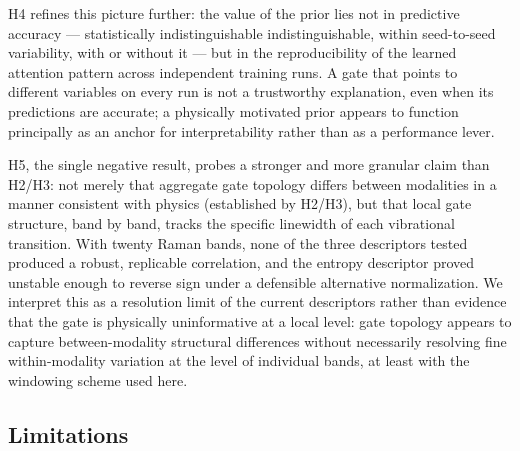 \documentclass[preprint,12pt]{elsarticle}
\providecommand{\DIFaddtex}[1]{{\protect\color{blue} \sf #1}} %
\providecommand{\DIFdeltex}[1]{{\protect\color{red} \scriptsize #1}} %
\providecommand{\DIFaddbegin}{} %
\providecommand{\DIFaddend}{} %
\providecommand{\DIFdelbegin}{} %
\providecommand{\DIFdelend}{} %
\providecommand{\DIFadd}[1]{\texorpdfstring{\DIFaddtex{#1}}{#1}} %
\providecommand{\DIFdel}[1]{\texorpdfstring{\DIFdeltex{#1}}{}} %
\providecommand{\DIFscaledelfig}{0.5}
\newlength{\DIFdelgraphicswidth} %
\newlength{\DIFdelgraphicsheight} %
\providecommand{\DIFaddincludegraphics}[2][]{{\color{blue}\fbox{\DIFOincludegraphics[#1]{#2}}}} %
\providecommand{\DIFdelincludegraphics}[2][]{%
\sbox{\DIFdelgraphicsbox}{\DIFOincludegraphics[#1]{#2}}%
\settoboxwidth{\DIFdelgraphicswidth}{\DIFdelgraphicsbox} %
\settoboxtotalheight{\DIFdelgraphicsheight}{\DIFdelgraphicsbox} %
\scalebox{\DIFscaledelfig}{%
\parbox[b]{\DIFdelgraphicswidth}{\usebox{\DIFdelgraphicsbox}\\[-\baselineskip] \rule{\DIFdelgraphicswidth}{0em}}\llap{\resizebox{\DIFdelgraphicswidth}{\DIFdelgraphicsheight}{%
\setlength{\unitlength}{\DIFdelgraphicswidth}%
\begin{picture}(1,1)%
\thicklines\linethickness{2pt} %
{\color[rgb]{1,0,0}\put(0,0){\framebox(1,1){}}}%
{\color[rgb]{1,0,0}\put(0,0){\line( 1,1){1}}}%
{\color[rgb]{1,0,0}\put(0,1){\line(1,-1){1}}}%
\end{picture}%
}\hspace*{3pt}}} %
} %
\DeclareRobustCommand{\DIFaddbegin}{\DIFOaddbegin \let\includegraphics\DIFaddincludegraphics} %
\DeclareRobustCommand{\DIFaddend}{\DIFOaddend \let\includegraphics\DIFOincludegraphics} %
\DeclareRobustCommand{\DIFdelbegin}{\DIFOdelbegin \let\includegraphics\DIFdelincludegraphics} %
\DeclareRobustCommand{\DIFdelend}{\DIFOaddend \let\includegraphics\DIFOincludegraphics} %
\begin{document}
H4 refines this picture further: the value of the prior lies not in predictive accuracy --- \DIFdelbegin \DIFdel{statistically indistinguishable}\DIFdelend \DIFaddbegin \DIFadd{indistinguishable, within seed-to-seed variability, }\DIFaddend with or without it --- but in the reproducibility of the learned attention pattern across independent training runs. A gate that points to different variables on every run is not a trustworthy explanation, even when its predictions are accurate; a physically motivated prior appears to function principally as an anchor for interpretability rather than as a performance lever.

H5, the single negative result, probes a stronger and more granular claim than H2/H3: not merely that aggregate gate topology differs between modalities in a manner consistent with physics (established by H2/H3), but that local gate structure, band by band, tracks the specific linewidth of each vibrational transition. With twenty Raman bands, none of the three descriptors tested produced a robust, replicable correlation, and the entropy descriptor proved unstable enough to reverse sign under a defensible alternative normalization. We interpret this as a resolution limit of the current descriptors rather than evidence that the gate is physically uninformative at a local level: gate topology appears to capture between-modality structural differences without necessarily resolving fine within-modality variation at the level of individual bands, at least with the windowing scheme used here.

\subsection{Limitations}
\end{document}
